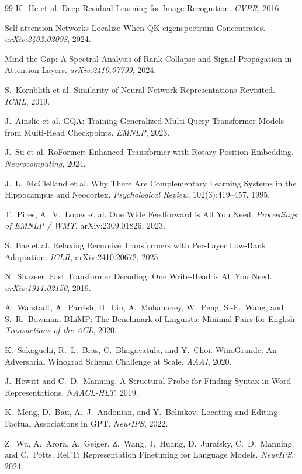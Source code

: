 \documentclass[10pt,twocolumn]{article}
\begin{document}
\begin{thebibliography}{99}
K.~He et al.
\newblock Deep Residual Learning for Image Recognition.
\newblock \emph{CVPR}, 2016.

Self-attention Networks Localize When QK-eigenspectrum Concentrates.
\newblock \emph{arXiv:2402.02098}, 2024.

Mind the Gap: A Spectral Analysis of Rank Collapse and Signal Propagation in Attention Layers.
\newblock \emph{arXiv:2410.07799}, 2024.

S.~Kornblith et al.
\newblock Similarity of Neural Network Representations Revisited.
\newblock \emph{ICML}, 2019.

J.~Ainslie et al.
\newblock GQA: Training Generalized Multi-Query Transformer Models from Multi-Head Checkpoints.
\newblock \emph{EMNLP}, 2023.

J.~Su et al.
\newblock RoFormer: Enhanced Transformer with Rotary Position Embedding.
\newblock \emph{Neurocomputing}, 2024.

J.~L.~McClelland et al.
\newblock Why There Are Complementary Learning Systems in the Hippocampus and Neocortex.
\newblock \emph{Psychological Review}, 102(3):419--457, 1995.

T.~Pires, A.~V.~Lopes et al.
\newblock One Wide Feedforward is All You Need.
\newblock \emph{Proceedings of EMNLP / WMT}, arXiv:2309.01826, 2023.

S.~Bae et al.
\newblock Relaxing Recursive Transformers with Per-Layer Low-Rank Adaptation.
\newblock \emph{ICLR}, arXiv:2410.20672, 2025.

N.~Shazeer.
\newblock Fast Transformer Decoding: One Write-Head is All You Need.
\newblock \emph{arXiv:1911.02150}, 2019.

A.~Warstadt, A.~Parrish, H.~Liu, A.~Mohananey, W.~Peng, S.-F.~Wang, and S.~R.~Bowman.
\newblock BLiMP: The Benchmark of Linguistic Minimal Pairs for English.
\newblock \emph{Transactions of the ACL}, 2020.

K.~Sakaguchi, R.~L.~Bras, C.~Bhagavatula, and Y.~Choi.
\newblock WinoGrande: An Adversarial Winograd Schema Challenge at Scale.
\newblock \emph{AAAI}, 2020.

J.~Hewitt and C.~D.~Manning.
\newblock A Structural Probe for Finding Syntax in Word Representations.
\newblock \emph{NAACL-HLT}, 2019.

K.~Meng, D.~Bau, A.~J.~Andonian, and Y.~Belinkov.
\newblock Locating and Editing Factual Associations in GPT.
\newblock \emph{NeurIPS}, 2022.

Z.~Wu, A.~Arora, A.~Geiger, Z.~Wang, J.~Huang, D.~Jurafsky, C.~D.~Manning, and C.~Potts.
\newblock ReFT: Representation Finetuning for Language Models.
\newblock \emph{NeurIPS}, 2024.

\end{thebibliography}
\end{document}
